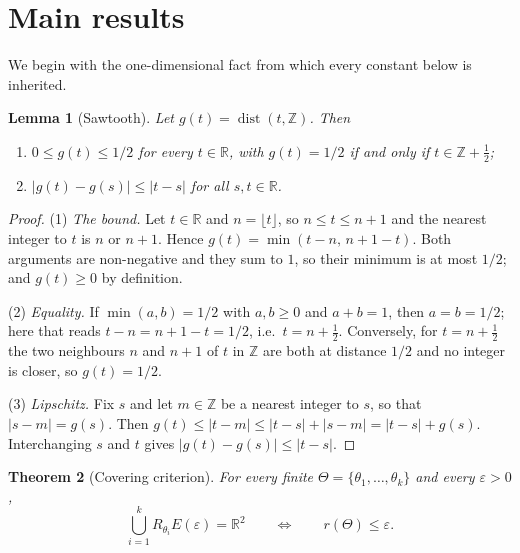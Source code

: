 \documentclass[11pt]{article}
\theoremstyle{plain}
\newtheorem{theorem}{Theorem}[section]
\newtheorem{lemma}[theorem]{Lemma}
\theoremstyle{definition}
\theoremstyle{remark}
\newcommand{\dZ}{\operatorname{dist}}
\newcommand{\R}{\mathbb{R}}
\newcommand{\Z}{\mathbb{Z}}
\begin{document}
\section{Main results}
\label{sec:main}

We begin with the one-dimensional fact from which every constant below is inherited.

\begin{lemma}[Sawtooth]
\label{lem:saw}
Let $g(t)=\dZ(t,\Z)$. Then
\begin{enumerate}
\item[(i)] $0\le g(t)\le1/2$ for every $t\in\R$, with $g(t)=1/2$ if and only if
$t\in\Z+\tfrac12$;
\item[(ii)] $|g(t)-g(s)|\le|t-s|$ for all $s,t\in\R$.
\end{enumerate}
\end{lemma}

\begin{proof}
(1) \emph{The bound.} Let $t\in\R$ and $n=\lfloor t\rfloor$, so $n\le t\le n+1$ and the nearest
integer to $t$ is $n$ or $n+1$. Hence $g(t)=\min(t-n,\,n+1-t)$. Both arguments are non-negative and
they sum to $1$, so their minimum is at most $1/2$; and $g(t)\ge0$ by definition.

(2) \emph{Equality.} If $\min(a,b)=1/2$ with $a,b\ge0$ and $a+b=1$, then $a=b=1/2$; here that reads
$t-n=n+1-t=1/2$, i.e.\ $t=n+\tfrac12$. Conversely, for $t=n+\tfrac12$ the two neighbours $n$ and
$n+1$ of $t$ in $\Z$ are both at distance $1/2$ and no integer is closer, so $g(t)=1/2$.

(3) \emph{Lipschitz.} Fix $s$ and let $m\in\Z$ be a nearest integer to $s$, so that $|s-m|=g(s)$.
Then $g(t)\le|t-m|\le|t-s|+|s-m|=|t-s|+g(s)$. Interchanging $s$ and $t$ gives
$|g(t)-g(s)|\le|t-s|$.
\end{proof}

\begin{theorem}[Covering criterion]
\label{lem:criterion}
For every finite $\Theta=\{\theta_1,\dots,\theta_k\}$ and every $\varepsilon>0$,
\[
\bigcup_{i=1}^{k}R_{\theta_i}E(\varepsilon)=\R^2
\qquad\Longleftrightarrow\qquad
r(\Theta)\le\varepsilon .
\]
\end{theorem}
\end{document}
